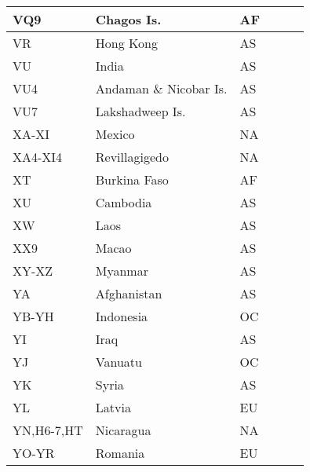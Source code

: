 \documentclass[a4paper]{article}
\begin{document}
\begin{longtable}{|p{1.5cm}|p{4cm}|l|p{2cm}|p{2cm}|p{2cm}|}
\hline
VQ9                    & Chagos Is.                                 & AF    & & & \\
\hline
VR                     & Hong Kong                                  & AS    & & & \\
\hline
VU                     & India                                      & AS    & & & \\
\hline
VU4                    & Andaman \& Nicobar Is.                     & AS    & & & \\
\hline
VU7                    & Lakshadweep Is.                            & AS    & & & \\
\hline
XA-XI                  & Mexico                                     & NA    & & & \\
\hline
XA4-XI4                & Revillagigedo                              & NA    & & & \\
\hline
XT                     & Burkina Faso                               & AF    & & & \\
\hline
XU                     & Cambodia                                   & AS    & & & \\
\hline
XW                     & Laos                                       & AS    & & & \\
\hline
XX9                    & Macao                                      & AS    & & & \\
\hline
XY-XZ                  & Myanmar                                    & AS    & & & \\
\hline
YA                     & Afghanistan                                & AS    & & & \\
\hline
YB-YH                  & Indonesia                                  & OC    & & & \\
\hline
YI                     & Iraq                                       & AS    & & & \\
\hline
YJ                     & Vanuatu                                    & OC    & & & \\
\hline
YK                     & Syria                                      & AS    & & & \\
\hline
YL                     & Latvia                                     & EU    & & & \\
\hline
YN,H6-7,HT             & Nicaragua                                  & NA    & & & \\
\hline
YO-YR                  & Romania                                    & EU    & & & \\

\end{longtable}
\end{document}

